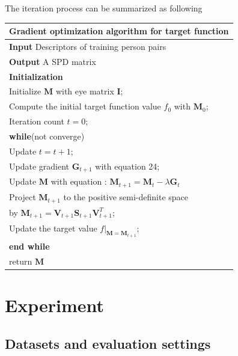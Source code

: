 \documentclass[conference,compsoc]{IEEEtran}
\begin{document}
 The iteration process can be summarized as following \newline \newline 
 \begin{tabular}{l}
 \hline 
 \multicolumn{1}{l}{\textbf{Gradient optimization algorithm for target function}} \\
 \hline
 \textbf{Input} Descriptors of training person pairs \\
 \textbf{Output} A SPD matrix\\
 \textbf{Initialization} \\
 Initialize $\bm{M}$ with eye matrix $\bm{I}$; \\
 Compute the initial target function value $f_0$ with $\bm{M}_0$;\\
 Iteration count  $t = 0$;\\

 \textbf{while}(not converge)\\
 \indent Update $t =  t + 1$;\\
 \indent Update gradient $\bm{G}_{t+1}$ with equation 24;\\
 \indent Update $\bm{M}$ with equation : $\bm{M}_{t+1} = \bm{M}_{t} - \lambda\bm{G}_t$\\
 \indent Project $\bm{M}_{t+1}$ to the positive semi-definite space \\ 
 \indent \indent by $\bm{M}_{t+1}= \bm{V}_{t+1}\bm{S}_{t+1}\bm{V}^T_{t+1}$;\\
 \indent Update the target value $f|_{\bm{M} = \bm{M}_{t+1}}$;\\
 \textbf{end while}  \\
 return $\bm{M}$\\
 \hline

 \end{tabular} 
 \newline 
 
\section{Experiment}
\subsection{Datasets and evaluation settings}
\end{document}
